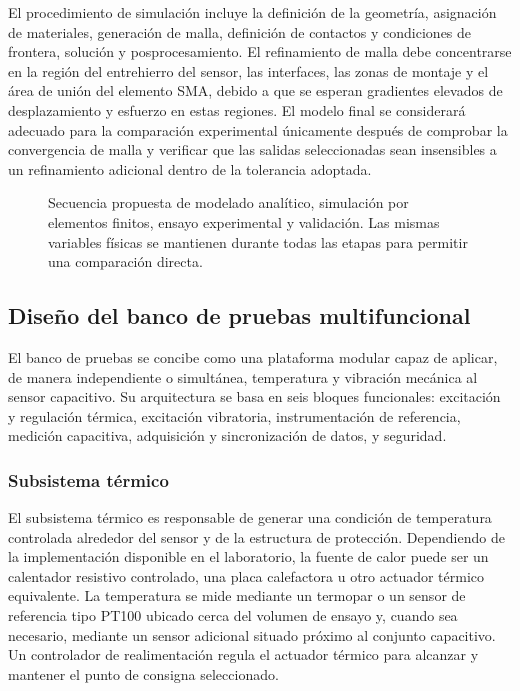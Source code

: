 \documentclass[conference]{IEEEtran}
\begin{document}
El procedimiento de simulación incluye la definición de la geometría, asignación de materiales, generación de malla, definición de contactos y condiciones de frontera, solución y posprocesamiento. El refinamiento de malla debe concentrarse en la región del entrehierro del sensor, las interfaces, las zonas de montaje y el área de unión del elemento SMA, debido a que se esperan gradientes elevados de desplazamiento y esfuerzo en estas regiones. El modelo final se considerará adecuado para la comparación experimental únicamente después de comprobar la convergencia de malla y verificar que las salidas seleccionadas sean insensibles a un refinamiento adicional dentro de la tolerancia adoptada.


\begin{figure}[t]
\centering
{}
\caption{Secuencia propuesta de modelado analítico, simulación por elementos finitos, ensayo experimental y validación. Las mismas variables físicas se mantienen durante todas las etapas para permitir una comparación directa.}
\label{fig:method_sequence}
\end{figure}

\subsection{Diseño del banco de pruebas multifuncional}

El banco de pruebas se concibe como una plataforma modular capaz de aplicar, de manera independiente o simultánea, temperatura y vibración mecánica al sensor capacitivo. Su arquitectura se basa en seis bloques funcionales: excitación y regulación térmica, excitación vibratoria, instrumentación de referencia, medición capacitiva, adquisición y sincronización de datos, y seguridad.

\subsubsection{Subsistema térmico}

El subsistema térmico es responsable de generar una condición de temperatura controlada alrededor del sensor y de la estructura de protección. Dependiendo de la implementación disponible en el laboratorio, la fuente de calor puede ser un calentador resistivo controlado, una placa calefactora u otro actuador térmico equivalente. La temperatura se mide mediante un termopar o un sensor de referencia tipo PT100 ubicado cerca del volumen de ensayo y, cuando sea necesario, mediante un sensor adicional situado próximo al conjunto capacitivo. Un controlador de realimentación regula el actuador térmico para alcanzar y mantener el punto de consigna seleccionado.
\end{document}
